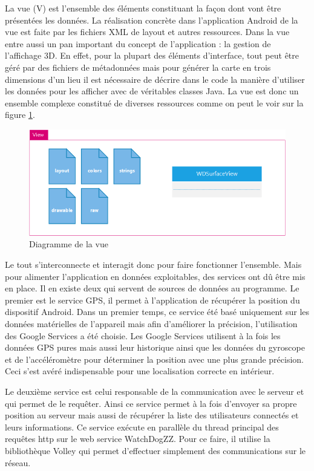 La vue (V) est l’ensemble des éléments constituant la façon dont vont être présentées les données. La réalisation concrète dans l’application Android de la vue est faite par les fichiers XML de layout et autres ressources. Dans la vue entre aussi un pan important du concept de l’application : la gestion de l’affichage 3D. En effet, pour la plupart des éléments d’interface, tout peut être géré par des fichiers de métadonnées mais pour générer la carte en trois dimensions d’un lieu il est nécessaire de décrire dans le code la manière d’utiliser les données pour les afficher avec de véritables classes Java. La vue est donc un ensemble complexe constitué de diverses ressources comme on peut le voir sur la figure \ref{view}.

\begin{figure}[H]
    \centering
    \includegraphics[width=\textwidth]{./img/android-view.png}
    \caption{Diagramme de la vue}
    \label{view}
\end{figure}

Le tout s’interconnecte et interagit donc pour faire fonctionner l’ensemble. Mais pour alimenter l’application en données exploitables, des services ont dû être mis en place. Il en existe deux qui servent de sources de données au programme. Le premier est le service GPS, il permet à l’application de récupérer la position du dispositif Android. Dans un premier temps, ce service été basé uniquement sur les données matérielles de l’appareil mais afin d’améliorer la précision, l’utilisation des Google Services a été choisie. Les Google Services utilisent à la fois les données GPS pures mais aussi leur historique ainsi que les données du gyroscope et de l’accéléromètre pour déterminer la position avec une plus grande précision. Ceci s’est avéré indispensable pour une localisation correcte en intérieur.

Le deuxième service est celui responsable de la communication avec le serveur et qui permet de le requêter. Ainsi ce service permet à la fois d’envoyer sa propre position au serveur mais aussi de récupérer la liste des utilisateurs connectés et leurs informations. Ce service exécute en parallèle du thread principal des requêtes http sur le web service WatchDogZZ. Pour ce faire, il utilise la bibliothèque Volley qui permet d’effectuer simplement des communications sur le réseau.

